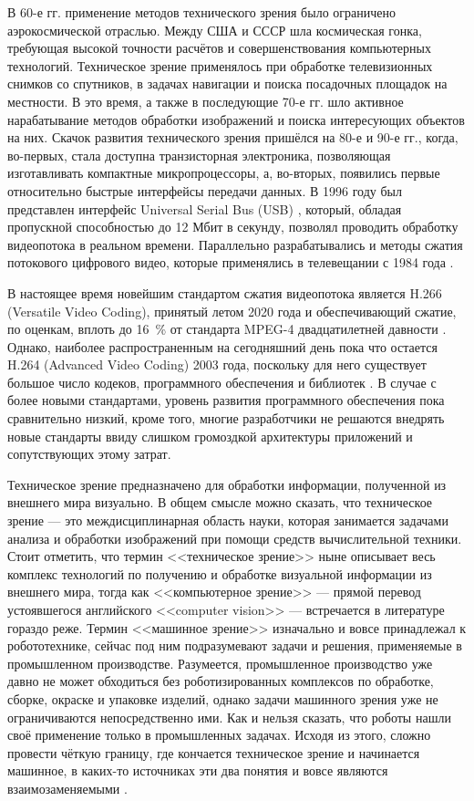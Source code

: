 В 60-е гг. применение методов технического зрения было ограничено аэрокосмической отраслью. Между США и СССР шла космическая гонка, требующая высокой точности расчётов и совершенствования компьютерных технологий. Техническое зрение применялось при обработке телевизионных снимков со спутников, в задачах навигации и поиска посадочных площадок на местности. В это время, а также в последующие 70-е гг. шло активное нарабатывание методов обработки изображений и поиска интересующих объектов на них. Скачок развития технического зрения пришёлся на 80-е и 90-е гг., когда, во-первых, стала доступна транзисторная электроника, позволяющая изготавливать компактные микропроцессоры, а, во-вторых, появились первые относительно быстрые интерфейсы передачи данных. В 1996 году был представлен интерфейс Universal Serial Bus (USB) \cite{usb}, который, обладая пропускной способностью до 12 Мбит в секунду, позволял проводить обработку видеопотока в реальном времени. Параллельно разрабатывались и методы сжатия потокового цифрового видео, которые применялись в телевещании с 1984 года \cite{video-history}. 

В настоящее время новейшим стандартом сжатия видеопотока является H.266 (Versatile Video Coding), принятый летом 2020 года и обеспечивающий сжатие, по оценкам, вплоть до 16~\% от стандарта MPEG-4 двадцатилетней давности \cite{vvc-coding}. Однако, наиболее распространенным на сегодняшний день пока что остается H.264 (Advanced Video Coding) 2003 года, поскольку для него существует большое число кодеков, программного обеспечения и библиотек \cite{h264}. В случае с более новыми стандартами, уровень развития программного обеспечения пока сравнительно низкий, кроме того, многие разработчики не решаются внедрять новые стандарты ввиду слишком громоздкой архитектуры приложений и сопутствующих этому затрат.

Техническое зрение предназначено для обработки информации, полученной из внешнего мира визуально. В общем смысле можно сказать, что техническое зрение --- это междисциплинарная область науки, которая занимается задачами анализа и обработки изображений при помощи средств вычислительной техники. Стоит отметить, что термин <<техническое зрение>> ныне описывает весь комплекс технологий по получению и обработке визуальной информации из внешнего мира, тогда как <<компьютерное зрение>> --- прямой перевод устоявшегося английского <<computer vision>> --- встречается в литературе гораздо реже. Термин <<машинное зрение>> изначально и вовсе принадлежал к робототехнике, сейчас под ним подразумевают задачи и решения, применяемые в промышленном производстве. Разумеется, промышленное производство уже давно не может обходиться без роботизированных комплексов по обработке, сборке, окраске и упаковке изделий, однако задачи машинного зрения уже не ограничиваются непосредственно ими. Как и нельзя сказать, что роботы нашли своё применение только в промышленных задачах. Исходя из этого, сложно провести чёткую границу, где кончается техническое зрение и начинается машинное, в каких-то источниках эти два понятия и вовсе являются взаимозаменяемыми \cite{Shapiro, Forsyth}.

